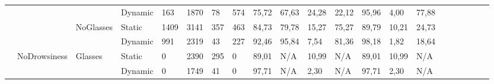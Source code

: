 \documentclass[12pt]{article}
\begin{document}
\begin{landscape}
\begin{table}[]
\begin{adjustbox}{width=1.4\textwidth}
\begin{tabular}{lllllllllllllllccllll}
				\multicolumn{1}{|l|}{} & \multicolumn{1}{l|}{} & \multicolumn{1}{l|}{} & \multicolumn{1}{l|}{Dynamic} & \multicolumn{1}{l|}{163} & \multicolumn{1}{l|}{1870} & \multicolumn{1}{l|}{78} & \multicolumn{1}{l|}{574} & \multicolumn{1}{l|}{75,72} & \multicolumn{1}{l|}{67,63} & \multicolumn{1}{l|}{24,28} & \multicolumn{1}{l|}{22,12} & \multicolumn{1}{l|}{95,96} & \multicolumn{1}{l|}{4,00} & \multicolumn{1}{l|}{77,88} & \multicolumn{1}{c|}{} & \multicolumn{1}{c|}{} & \multicolumn{1}{l|}{} & \multicolumn{1}{l|}{} & \multicolumn{1}{l|}{} & \multicolumn{1}{l|}{}\\ \cline{3-15}
				\multicolumn{1}{|l|}{} & \multicolumn{1}{l|}{} & \multicolumn{1}{l|}{\multirow{2}{*}{NoGlasses}} & \multicolumn{1}{l|}{Static}  & \multicolumn{1}{l|}{1409} & \multicolumn{1}{l|}{3141} & \multicolumn{1}{l|}{357} & \multicolumn{1}{l|}{463} & \multicolumn{1}{l|}{84,73} & \multicolumn{1}{l|}{79,78} & \multicolumn{1}{l|}{15,27} & \multicolumn{1}{l|}{75,27} & \multicolumn{1}{l|}{89,79} & \multicolumn{1}{l|}{10,21} & \multicolumn{1}{l|}{24,73} & \multicolumn{1}{c|}{} & \multicolumn{1}{c|}{} & \multicolumn{1}{l|}{} & \multicolumn{1}{l|}{} & \multicolumn{1}{l|}{} & \multicolumn{1}{l|}{}\\ \cline{4-15}
				\multicolumn{1}{|l|}{} & \multicolumn{1}{l|}{} & \multicolumn{1}{l|}{} & \multicolumn{1}{l|}{Dynamic} & \multicolumn{1}{l|}{991} & \multicolumn{1}{l|}{2319} & \multicolumn{1}{l|}{43} & \multicolumn{1}{l|}{227} & \multicolumn{1}{l|}{92,46} & \multicolumn{1}{l|}{95,84} & \multicolumn{1}{l|}{7,54} & \multicolumn{1}{l|}{81,36} & \multicolumn{1}{l|}{98,18} & \multicolumn{1}{l|}{1,82} & \multicolumn{1}{l|}{18,64} & \multicolumn{1}{c|}{} & \multicolumn{1}{c|}{} & \multicolumn{1}{l|}{} & \multicolumn{1}{l|}{} & \multicolumn{1}{l|}{} & \multicolumn{1}{l|}{} \\ \cline{2-15}
				\multicolumn{1}{|l|}{} & \multicolumn{1}{l|}{\multirow{4}{*}{NoDrowsiness}} & \multicolumn{1}{l|}{\multirow{2}{*}{Glasses}} & \multicolumn{1}{l|}{Static} & \multicolumn{1}{l|}{0} & \multicolumn{1}{l|}{2390} & \multicolumn{1}{l|}{295} & \multicolumn{1}{l|}{0} & \multicolumn{1}{l|}{89,01} & \multicolumn{1}{l|}{N/A} & \multicolumn{1}{l|}{10,99} & \multicolumn{1}{l|}{N/A} & \multicolumn{1}{l|}{89,01} & \multicolumn{1}{l|}{10,99} & \multicolumn{1}{l|}{N/A} & \multicolumn{1}{c|}{} & \multicolumn{1}{c|}{} & \multicolumn{1}{l|}{} & \multicolumn{1}{l|}{} & \multicolumn{1}{l|}{} & \multicolumn{1}{l|}{}\\ \cline{4-15}
				\multicolumn{1}{|l|}{} & \multicolumn{1}{l|}{} & \multicolumn{1}{l|}{} & \multicolumn{1}{l|}{Dynamic} & \multicolumn{1}{l|}{0} & \multicolumn{1}{l|}{1749} & \multicolumn{1}{l|}{41} & \multicolumn{1}{l|}{0} & \multicolumn{1}{l|}{97,71} & \multicolumn{1}{l|}{N/A} & \multicolumn{1}{l|}{2,30} & \multicolumn{1}{l|}{N/A} & \multicolumn{1}{l|}{97,71} & \multicolumn{1}{l|}{2,30} & \multicolumn{1}{l|}{N/A} & \multicolumn{1}{c|}{} & \multicolumn{1}{c|}{} & \multicolumn{1}{l|}{} & \multicolumn{1}{l|}{} & \multicolumn{1}{l|}{} & \multicolumn{1}{l|}{}\\ \cline{3-15}

\end{tabular}
\end{adjustbox}
\end{table}
\end{landscape}
\end{document}
